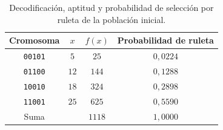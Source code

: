 \begin{table}[H]
\centering
\small
\setlength{\tabcolsep}{6pt}
\renewcommand{\arraystretch}{1.15}
\begin{tabular}{|c|c|c|c|}
\hline
\rowcolor{encabezado}\textbf{Cromosoma} & \textbf{$x$} & \textbf{$f(x)$} & \textbf{Probabilidad de ruleta} \\
\hline
\texttt{00101} & $5$ & $25$ & $0{,}0224$ \\
\hline
\texttt{01100} & $12$ & $144$ & $0{,}1288$ \\
\hline
\texttt{10010} & $18$ & $324$ & $0{,}2898$ \\
\hline
\texttt{11001} & $25$ & $625$ & $0{,}5590$ \\
\hline
Suma &  & $1118$ & $1{,}0000$ \\
\hline
\end{tabular}
\caption{Decodificación, aptitud y probabilidad de selección por ruleta de la población inicial.}
\label{tab:p1a-ruleta}
\end{table}
